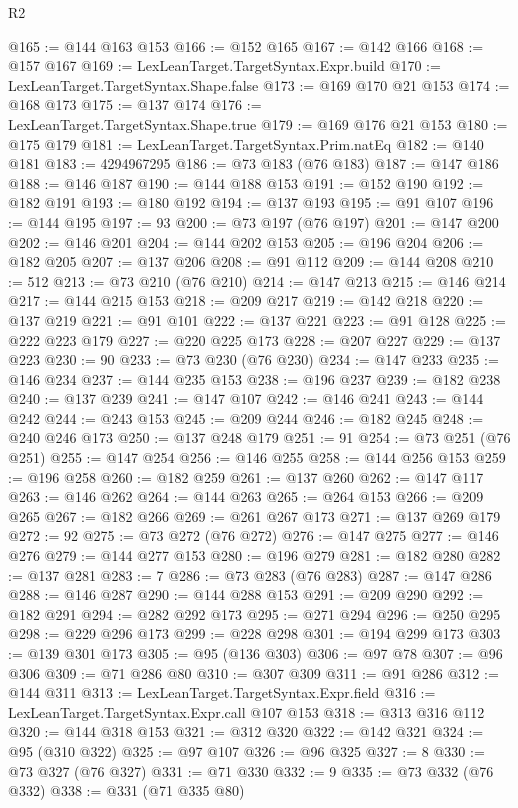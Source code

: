 \begin{lexlean}{R2}
\begin{coremodule}
@165 := @144 @163 @153
@166 := @152 @165
@167 := @142 @166
@168 := @157 @167
@169 := LexLeanTarget.TargetSyntax.Expr.build
@170 := LexLeanTarget.TargetSyntax.Shape.false
@173 := @169 @170 @21 @153
@174 := @168 @173
@175 := @137 @174
@176 := LexLeanTarget.TargetSyntax.Shape.true
@179 := @169 @176 @21 @153
@180 := @175 @179
@181 := LexLeanTarget.TargetSyntax.Prim.natEq
@182 := @140 @181
@183 := 4294967295
@186 := @73 @183 (@76 @183)
@187 := @147 @186
@188 := @146 @187
@190 := @144 @188 @153
@191 := @152 @190
@192 := @182 @191
@193 := @180 @192
@194 := @137 @193
@195 := @91 @107
@196 := @144 @195
@197 := 93
@200 := @73 @197 (@76 @197)
@201 := @147 @200
@202 := @146 @201
@204 := @144 @202 @153
@205 := @196 @204
@206 := @182 @205
@207 := @137 @206
@208 := @91 @112
@209 := @144 @208
@210 := 512
@213 := @73 @210 (@76 @210)
@214 := @147 @213
@215 := @146 @214
@217 := @144 @215 @153
@218 := @209 @217
@219 := @142 @218
@220 := @137 @219
@221 := @91 @101
@222 := @137 @221
@223 := @91 @128
@225 := @222 @223 @179
@227 := @220 @225 @173
@228 := @207 @227
@229 := @137 @223
@230 := 90
@233 := @73 @230 (@76 @230)
@234 := @147 @233
@235 := @146 @234
@237 := @144 @235 @153
@238 := @196 @237
@239 := @182 @238
@240 := @137 @239
@241 := @147 @107
@242 := @146 @241
@243 := @144 @242
@244 := @243 @153
@245 := @209 @244
@246 := @182 @245
@248 := @240 @246 @173
@250 := @137 @248 @179
@251 := 91
@254 := @73 @251 (@76 @251)
@255 := @147 @254
@256 := @146 @255
@258 := @144 @256 @153
@259 := @196 @258
@260 := @182 @259
@261 := @137 @260
@262 := @147 @117
@263 := @146 @262
@264 := @144 @263
@265 := @264 @153
@266 := @209 @265
@267 := @182 @266
@269 := @261 @267 @173
@271 := @137 @269 @179
@272 := 92
@275 := @73 @272 (@76 @272)
@276 := @147 @275
@277 := @146 @276
@279 := @144 @277 @153
@280 := @196 @279
@281 := @182 @280
@282 := @137 @281
@283 := 7
@286 := @73 @283 (@76 @283)
@287 := @147 @286
@288 := @146 @287
@290 := @144 @288 @153
@291 := @209 @290
@292 := @182 @291
@294 := @282 @292 @173
@295 := @271 @294
@296 := @250 @295
@298 := @229 @296 @173
@299 := @228 @298
@301 := @194 @299 @173
@303 := @139 @301 @173
@305 := @95 (@136 @303)
@306 := @97 @78
@307 := @96 @306
@309 := @71 @286 @80
@310 := @307 @309
@311 := @91 @286
@312 := @144 @311
@313 := LexLeanTarget.TargetSyntax.Expr.field
@316 := LexLeanTarget.TargetSyntax.Expr.call @107 @153
@318 := @313 @316 @112
@320 := @144 @318 @153
@321 := @312 @320
@322 := @142 @321
@324 := @95 (@310 @322)
@325 := @97 @107
@326 := @96 @325
@327 := 8
@330 := @73 @327 (@76 @327)
@331 := @71 @330
@332 := 9
@335 := @73 @332 (@76 @332)
@338 := @331 (@71 @335 @80)

\end{coremodule}
\end{lexlean}
